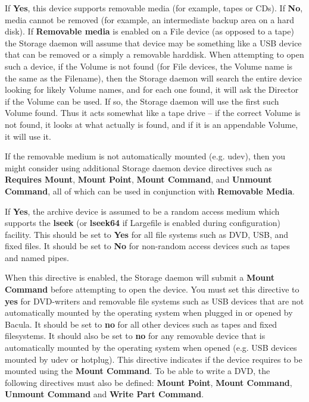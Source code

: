 \begin{description}
\label{removablemedia}
\item [Removable media = {\it yes\vb{}no}]
   If {\bf Yes}, this device supports removable media (for example, tapes
   or CDs).  If {\bf No}, media cannot be removed (for example, an
   intermediate backup area on a hard disk). If {\bf Removable media} is
   enabled on a File device (as opposed to a tape) the Storage daemon will
   assume that device may be something like a USB device that can be
   removed or a simply a removable harddisk. When attempting to open
   such a device, if the Volume is not found (for File devices, the Volume
   name is the same as the Filename), then the Storage daemon will search
   the entire device looking for likely Volume names, and for each one 
   found, it will ask the Director if the Volume can be used.  If so,
   the Storage daemon will use the first such Volume found.  Thus it
   acts somewhat like a tape drive -- if the correct Volume is not found,
   it looks at what actually is found, and if it is an appendable Volume,
   it will use it.

   If the removable medium is not automatically mounted (e.g. udev), then
   you might consider using additional Storage daemon device directives
   such as {\bf Requires Mount}, {\bf Mount Point}, {\bf Mount Command},
   and {\bf Unmount Command}, all of which can be used in conjunction with
   {\bf Removable Media}.    


\item [Random access = {\it yes\vb{}no}]
   If {\bf Yes}, the archive device is assumed to be a random access medium
   which supports the {\bf lseek} (or {\bf lseek64} if Largefile is enabled
   during configuration) facility. This should be set to {\bf Yes} for all
   file systems such as DVD, USB, and fixed files.  It should be set to
   {\bf No} for non-random access devices such as tapes and named pipes.


\item [Requires Mount = {\it yes\vb{}no}]
   When this directive is enabled, the Storage daemon will submit
   a {\bf Mount Command} before attempting to open the device.
   You must set this directive to {\bf yes} for DVD-writers and removable
   file systems such as USB devices that are not automatically mounted
   by the operating system when plugged in or opened by Bacula.
   It should be set to {\bf no} for
   all other devices such as tapes and fixed filesystems. It should also
   be set to {\bf no} for any removable device that is automatically
   mounted by the operating system when opened (e.g. USB devices mounted
   by udev or hotplug). This directive
   indicates if the device requires to be mounted using the {\bf Mount
   Command}.  To be able to write a DVD, the following directives must also
   be defined: {\bf Mount Point}, {\bf Mount Command}, {\bf Unmount
   Command} and {\bf Write Part Command}.


\end{description}
